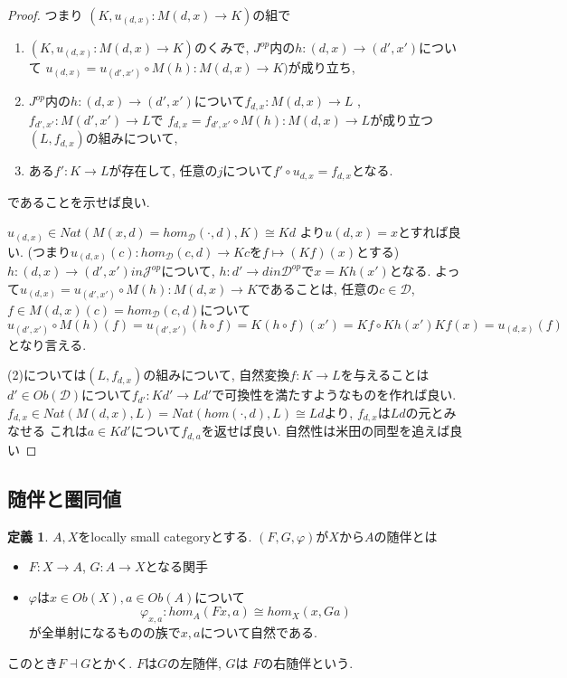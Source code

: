 \documentclass[dvipdfmx,a4paper,11pt]{report}
\theoremstyle{definition}
\newtheorem{dfn}[thm]{定義}
\begin{document}
\begin{proof}
つまり
$(K, u_{(d,x)}: M(d,x) \to K)$の組で
\begin{enumerate}
\item $(K, u_{(d,x)}: M(d,x) \to K)$のくみで, $J ^{op}$内の$h : (d,x)\to (d',x')$について
$u_{(d,x)}  = u_{(d',x')} \circ M(h) : M(d ,x) \to K)$が成り立ち, 
\item $J ^{op}$内の$h : (d,x)\to (d',x')$について$f_{d,x} : M(d,x) \to L$
, $f_{d',x'} : M(d',x') \to L$で
$f_{d,x}  = f_{d',x'}\circ M(h) : M(d,x) \to L$が成り立つ$(L, f_{d,x})$の組みについて,
\item ある$f' : K \to L$が存在して, 任意の$j$について$f' \circ u_{d,x} = f_{d,x}$となる.
\end{enumerate}
であることを示せば良い.

$u_{(d,x)} \in Nat(M(x, d)=hom_{\mathcal{D}}(\cdot, d), K) \cong Kd$
より$u{(d,x)} = x$とすれば良い. 
(つまり$u_{(d,x)}(c) : hom_{\mathcal{D}}(c, d) \to  Kc$を$f \mapsto (Kf)(x)$とする)
$h : (d,x)  \to (d',x') in \mathcal{J}^{op} $について, 
$h : d'  \to d in \mathcal{D}^{op}$で$x = Kh(x')$となる. 
よって$u_{(d,x)}  = u_{(d',x')} \circ M(h) : M(d ,x) \to K$であることは, 
任意の$c \in \mathcal{D}$, $f \in M(d ,x)(c) = hom_{\mathcal{D}}(c, d) $について
$$
u_{(d',x')} \circ M(h) (f)
= u_{(d',x')} (h \circ f) 
=K(h \circ f) (x')
=Kf\circ Kh (x')
Kf (x)=u_{(d,x)}(f) 
$$
となり言える. 

(2)については$(L, f_{d,x})$の組みについて, 
自然変換$f : K \to L$を与えることは$d' \in Ob(\mathcal{D})$について$f_{d'} : Kd' \to Ld'$で可換性を満たすようなものを作れば良い. $f_{d,x} \in Nat( M(d,x), L)=Nat( hom(\cdot,d), L)\cong Ld$より, $f_{d,x}$は$Ld$の元とみなせる
これは$a \in Kd'$について$f_{d,a}$を返せば良い. 
自然性は米田の同型を追えば良い
\end{proof}

\subsection{随伴と圏同値}
 \begin{tcolorbox}
 [colback = white, colframe = green!35!black, fonttitle = \bfseries,breakable = true]
\begin{dfn}
$A,X$をlocally small categoryとする.
$(F,G,\varphi)$が$X$から$A$の随伴とは
\begin{itemize}
\item $F :X \to A$, $G : A \to X$となる関手
\item $\varphi$は$x \in Ob(X), a \in Ob(A)$について
$$
\varphi_{x,a} : hom_{A}(Fx, a) \cong hom_{X}(x, Ga)
$$
が全単射になるものの族で$x,a$について自然である. 
\end{itemize}
このとき$F\dashv G$とかく.
$F$は$G$の左随伴, $G$は $F$の右随伴という. 
\end{dfn}
\end{tcolorbox}
\end{document}
